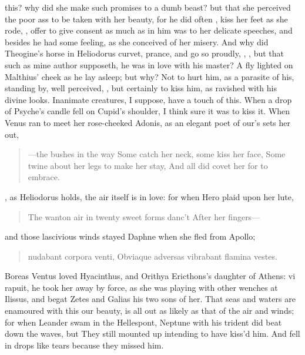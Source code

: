 this? why did she make such promises to a dumb beast? but that she
perceived the poor ass to be taken with her beauty, for he did often
, kiss her feet as she rode,
, offer to give consent as
much as in him was to her delicate speeches, and besides he had some
feeling, as she conceived of her misery. And why did Theogine's horse
in Heliodorus curvet, prance, and go so proudly, , \etc{}, but that such as mine author supposeth,
he was in love with his master?  A fly lighted on  Malthius'
cheek as he lay asleep; but why? Not to hurt him, as a parasite of his,
standing by, well perceived, , but
certainly to kiss him, as ravished with his divine looks. Inanimate
creatures, I suppose, have a touch of this. When a drop of
Psyche's candle fell on Cupid's shoulder, I think sure it was to
kiss it. When Venus ran to meet her rose-cheeked Adonis, as an elegant
poet of our's sets her out,

\begin{verse}%
---the bushes in the way
Some catch her neck, some kiss her face,
Some twine about her legs to make her stay,
And all did covet her for to embrace.
\end{verse}%

, as Heliodorus holds, the air itself is in
love: for when Hero plaid upon her lute,

\begin{verse}%
The wanton air in twenty sweet forms danc't
After her fingers---
\end{verse}%

and those lascivious winds stayed Daphne when she fled from Apollo;

\begin{latin}
\begin{verse}%
nudabant corpora venti,
Obviaque adversas vibrabant flamina vestes.
\end{verse}%
\end{latin}

Boreas Ventus loved Hyacinthus, and Orithya Ericthons's daughter of
Athens: vi rapuit, \etc{} he took her away by force, as she was playing
with other wenches at Ilissus, and begat Zetes and Galias his two sons
of her. That seas and waters are enamoured with this our beauty, is all
out as likely as that of the air and winds; for when Leander swam in
the Hellespont, Neptune with his trident did beat down the waves, but
They still mounted up intending to have kiss'd him.
And fell in drops like tears because they missed him.

